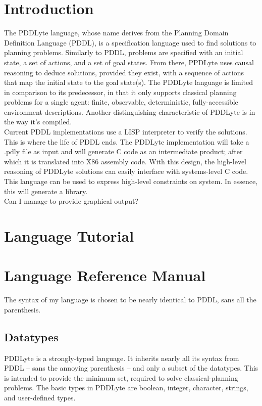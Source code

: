 \documentclass[
a4paper, %
11pt, %
onecolumn, %
openany, %
]{memoir}
\begin{document}
\clearpage
\tableofcontents*
\clearpage

\chapter{Introduction}
The PDDLyte language, whose name derives from the Planning Domain Definition Language (PDDL)\cite{pddl98}, is a specification language used to find solutions to planning problems. Similarly to PDDL, problems are specified with an initial state, a set of actions, and a set of goal states. From there, PPDLyte uses causal reasoning to deduce solutions, provided they exist, with a sequence of actions that map the initial state to the goal state(s). The PDDLyte language is limited in comparison to its predecessor, in that it only supports classical planning problems for a single agent: finite, observable, deterministic, fully-accessible  environment descriptions. Another distinguishing characteristic of PDDLyte is in the way it's compiled.\\

Current PDDL implementations use a LISP interpreter to verify the solutions. This is where the life of PDDL ends. The PDDLyte implementation will take a .pdly file as input and will generate C code as an intermediate product; after which it is translated into X86 assembly code. With this design, the high-level reasoning of PDDLyte solutions can easily interface with systems-level C code. This language can be used to express high-level constraints on system. In essence, this will generate a library.\\

Can I manage to provide graphical output?

\chapter{Language Tutorial}

\chapter{Language Reference Manual}
The syntax of my language is chosen to be nearly identical to PDDL, sans all the parenthesis.

\section{Datatypes}
PDDLyte is a strongly-typed language. It inherits nearly all its syntax from PDDL -- sans the annoying parenthesis -- and only a subset of the datatypes. This is intended to provide the minimum set, required to solve classical-planning problems. The basic types in PDDLyte are boolean, integer, character, strings, and user-defined types.
\end{document}

